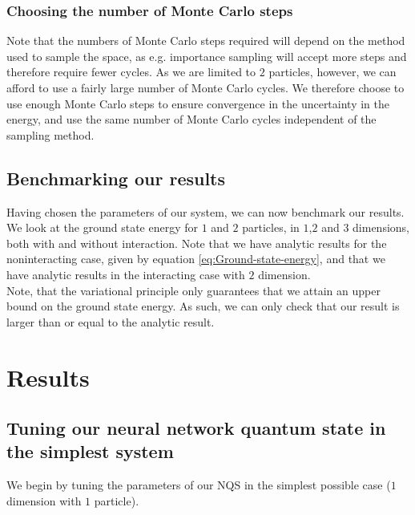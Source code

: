 \documentclass[a4paper, 10pt]{article}
\begin{document}
	\subsubsection{Choosing the number of Monte Carlo steps}
	Note that the numbers of Monte Carlo steps required will depend on the method used to sample the space, as e.g. importance sampling will accept more steps and therefore require fewer cycles. As we are limited to $2$ particles, however, we can afford to use a fairly large number of Monte Carlo cycles. We therefore choose to use enough Monte Carlo steps to ensure convergence in the uncertainty in the energy, and use the same number of Monte Carlo cycles independent of the sampling method. 
	\subsection{Benchmarking our results}
	Having chosen the parameters of our system, we can now benchmark our results. We look at the ground state energy for $1$ and $2$ particles, in $1$,$2$ and $3$ dimensions, both with and without interaction. Note that we have analytic results for the noninteracting case, given by equation \ref{eq:Ground-state-energy}, and that we have analytic results in the interacting case with $2$ dimension.\\
	\linebreak
	Note, that the variational principle only guarantees that we attain an upper bound on the ground state energy. As such, we can only check that our result is larger than or equal to the analytic result.
 	\section{Results}
	\subsection{Tuning our neural network quantum state in the simplest system}
	We begin by tuning the parameters of our NQS in the simplest possible case ($1$ dimension with $1$ particle).
\end{document}
